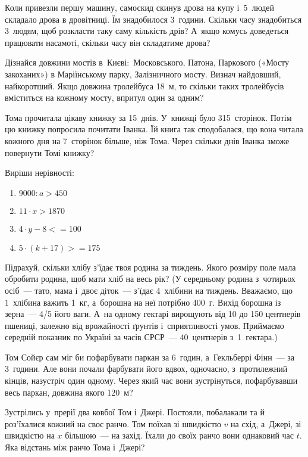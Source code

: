 Коли привезли першу машину, самоскид скинув дрова на купу і~5~людей
складало дрова в дровітниці. Їм знадобилося 3~години.
Скільки часу знадобиться 3~людям, щоб розкласти таку саму кількість дрів?
А~якщо комусь доведеться працювати насамоті, скільки часу він складатиме дрова?


\problem
Дізнайся довжини мостів в~Києві: Московського, Патона,
Паркового («Мосту закоханих») в Маріїнському парку, Залізничного мосту.
Визнач найдовший, найкоротший.
Якщо довжина тролейбуса 18~м, то скільки таких тролейбусів
вміститься на кожному мосту, впритул один за одним?


\problem
Тома прочитала цікаву книжку за 15~днів. У~книжці було 315~сторінок.
Потім цю книжку попросила почитати Іванка. Їй книга так сподобалася,
що вона читала кожного дня на 7~сторінок більше, ніж Тома.
Через скільки днів Іванка зможе повернути Томі книжку?


\problem
Виріши нерівності:
\begin{multicols}{2}
    \begin{enumerate}
        \item $9000 : a > 450$
        \item $11 \cdot x > 1870$
        \item $4 \cdot y - 8 <= 100$
        \item $5 \cdot (k + 17) >= 175$
    \end{enumerate}
\end{multicols}


\problem
Підрахуй, скільки хлібу з’їдає твоя родина за тиждень.
Якого розміру поле мала обробити родина, щоб мати хліб на весь рік?
(У середньому родина з~чотирьох осіб~--- тато, мама і~двоє діток~---
з’їдає 4~хлібини на тиждень. Вважаємо, що 1~хлібина важить 1~кг,
а~борошна на неї потрібно 400~г. Вихід борошна із зерна~--- 4/5 його ваги.
А~на одному гектарі вирощують від 10 до 150 центнерів пшениці,
залежно від врожайності ґрунтів і~сприятливості умов.
Приймаємо середній показник по Україні за часів СРСР~---
40~центнерів з~1~гектара.)


\problem
Том Сойєр сам міг би пофарбувати паркан за 6~годин,
а~Гекльберрі Фінн~--- за 3~години. Але вони почали фарбувати його вдвох,
одночасно, з~протилежний кінців, назустріч один одному.
Через який час вони зустрінуться, пофарбувавши весь паркан,
довжина якого 120~м?


\problem
Зустрілись у~прерії два ковбої Том і~Джері. Постояли, побалакали та й
роз’їхалися кожний на своє ранчо. Том поїхав зі швидкістю $v$ на схід,
а~Джері, зі швидкістю на $x$ більшою~--- на захід. Їхали до своїх ранчо
вони однаковий час $t$. Яка відстань між ранчо Тома і~Джері?

